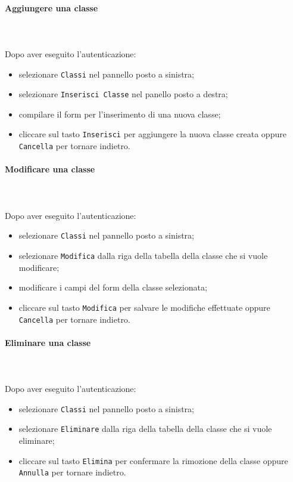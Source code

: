 \paragraph{Aggiungere una classe} \mbox{}\\ \mbox{}\\
Dopo aver eseguito l'autenticazione:
\begin{itemize}
	\item selezionare \texttt{Classi} nel pannello posto a sinistra;
	\item selezionare \texttt{Inserisci Classe} nel panello posto a destra;
	\item compilare il form per l'inserimento di una nuova classe;
	\item cliccare sul tasto \texttt{Inserisci} per aggiungere la nuova classe 
		creata oppure \texttt{Cancella} per tornare indietro.	
\end{itemize}

\paragraph{Modificare una classe} \mbox{}\\ \mbox{}\\
Dopo aver eseguito l'autenticazione:
\begin{itemize}
	\item selezionare \texttt{Classi} nel pannello posto a sinistra;
	\item selezionare \texttt{Modifica} dalla riga della tabella della classe
		che si vuole modificare;
	\item modificare i campi del form della classe selezionata;
	\item cliccare sul tasto \texttt{Modifica} per salvare le modifiche effettuate
		oppure \texttt{Cancella} per tornare indietro.
\end{itemize}

\paragraph{Eliminare una classe} \mbox{}\\ \mbox{}\\
Dopo aver eseguito l'autenticazione:
\begin{itemize}
	\item selezionare \texttt{Classi} nel pannello posto a sinistra;
	\item selezionare \texttt{Eliminare} dalla riga della tabella della classe
		che si vuole eliminare;
	\item cliccare sul tasto \texttt{Elimina} per confermare la rimozione della classe
		oppure \texttt{Annulla} per tornare indietro.
\end{itemize}

